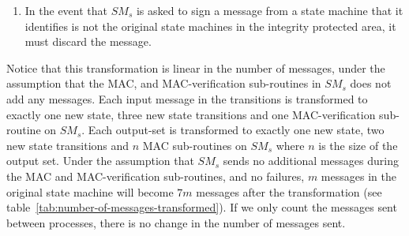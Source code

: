 \documentclass{article}
\begin{document}
\begin{enumerate}
		\item In the event that $SM_s$ is asked to sign a message from a state machine that it identifies is not the original state machines in the integrity protected area, it must discard the message.
	\end{enumerate}

	Notice that this transformation is linear in the number of messages, under the assumption that the MAC, and MAC-verification sub-routines in $SM_s$ does not add any messages.
	Each input message in the transitions is transformed to exactly one new state, three new state transitions and one MAC-verification sub-routine on $SM_s$.
	Each output-set is transformed to exactly one new state, two new state transitions and $n$ MAC sub-routines on $SM_s$ where $n$ is the size of the output set.
	Under the assumption that $SM_s$ sends no additional messages during the MAC and MAC-verification sub-routines, and no failures, $m$ messages in the original state machine will become $7m$ messages after the transformation (see table~\ref{tab:number-of-messages-transformed}).
	If we only count the messages sent between processes, there is no change in the number of messages sent.

	\begin{table}[ht!]
	\centering
	\caption{Number of messages after the transformation}
	\label{tab:number-of-messages-transformed}
	\end{table}
\end{document}
